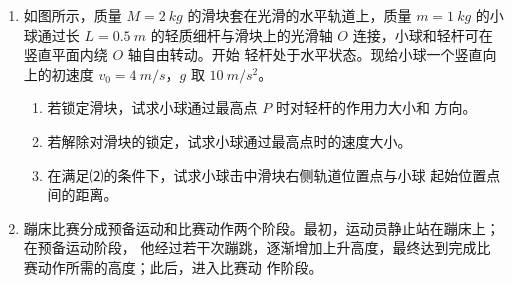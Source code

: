 \begin{enumerate}
{\begin{enumerate}
\end{enumerate}


}


\newpage
\item 
{}
如图所示，质量 $ M=2 \ kg $ 的滑块套在光滑的水平轨道上，质量 $ m=1 \ kg $ 的小球通过长
$ L=0.5 \ m $ 的轻质细杆与滑块上的光滑轴 $ O $ 连接，小球和轻杆可在竖直平面内绕 $ O $ 轴自由转动。开始
轻杆处于水平状态。现给小球一个竖直向上的初速度 $ v_{0} =4 \ m/s $，$ g $
取 $ 10 \ m/s^{2} $。
\begin{enumerate}
\renewcommand{\labelenumi}{\arabic{enumi}.}
\item 
若锁定滑块，试求小球通过最高点 $ P $ 时对轻杆的作用力大小和
方向。
\item 
若解除对滑块的锁定，试求小球通过最高点时的速度大小。
\item 
在满足⑵的条件下，试求小球击中滑块右侧轨道位置点与小球
起始位置点间的距离。




\end{enumerate}
\begin{figure}[h!]
\flushright

\end{figure}






\newpage
\item
{}
蹦床比赛分成预备运动和比赛动作两个阶段。最初，运动员静止站在蹦床上；在预备运动阶段，
他经过若干次蹦跳，逐渐增加上升高度，最终达到完成比赛动作所需的高度；此后，进入比赛动
作阶段。


\end{enumerate}
